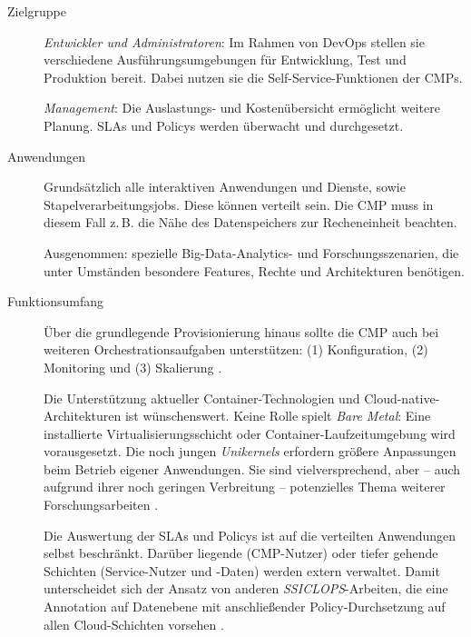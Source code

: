 \begin{description}
	
	\item[Zielgruppe] 	\emph{Entwickler und Administratoren}: Im Rahmen von DevOps stellen sie verschiedene Ausführungsumgebungen für Entwicklung, Test und Produktion bereit. Dabei nutzen sie die Self-Service-Funktionen der CMPs.
	
						\emph{Management}: Die Auslastungs- und Kostenübersicht ermöglicht weitere Planung. SLAs und Policys werden überwacht und durchgesetzt.
	
	\item[Anwendungen] Grundsätzlich alle interaktiven Anwendungen und Dienste, sowie Stapelverarbeitungsjobs. Diese können verteilt sein. Die CMP muss in diesem Fall z.\,B. die Nähe des Datenspeichers zur Recheneinheit beachten.
	
	Ausgenommen: spezielle Big-Data-Analytics- und Forschungsszenarien, die unter Umständen besondere Features, Rechte und Architekturen benötigen.
	
	\item[Funktionsumfang] Über die grundlegende Provisionierung hinaus sollte die CMP auch bei weiteren Orchestrationsaufgaben unterstützen: (1) Konfiguration, (2) Monitoring und (3) Skalierung \cite{weerasiri:2017:orchestration}.
	
	Die Unterstützung aktueller Container-Technologien und Cloud-native-Architekturen ist wünschenswert. Keine Rolle spielt \emph{Bare Metal}: Eine installierte Virtualisierungsschicht oder Container-Laufzeitumgebung wird vorausgesetzt. Die noch jungen \emph{Unikernels} erfordern größere Anpassungen beim Betrieb eigener Anwendungen. Sie sind vielversprechend, aber -- auch aufgrund ihrer noch geringen Verbreitung -- potenzielles Thema weiterer Forschungsarbeiten \cite{plauth:2017:unikernels}.
	
	Die Auswertung der SLAs und Policys ist auf die verteilten Anwendungen selbst beschränkt. Darüber liegende (CMP-Nutzer) oder tiefer gehende Schichten (Service-Nutzer und -Daten) werden extern verwaltet. Damit unterscheidet sich der Ansatz von anderen \emph{SSICLOPS}-Arbeiten, die eine Annotation auf Datenebene mit anschließender Policy-Durchsetzung auf allen Cloud-Schichten vorsehen \cite{ssiclops:d21:secure-data-storage, ssiclops:d22:intercloud-policies}.
		
\end{description}

